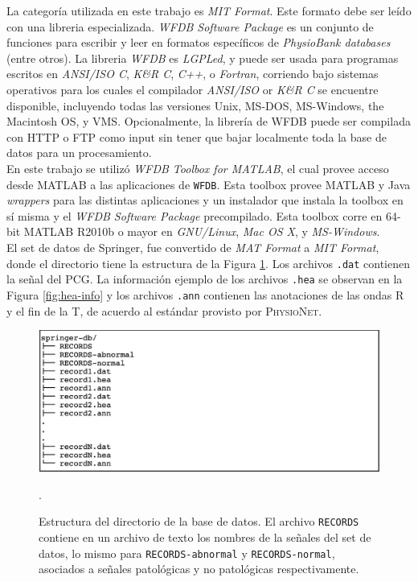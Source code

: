 \indent La categoría utilizada en este trabajo es \textit{MIT Format}. Este formato debe ser leído con una libreria
especializada. \textit{WFDB Software Package} es un conjunto de funciones para escribir y leer en formatos
específicos de \textit{PhysioBank databases} (entre otros). La libreria \textit{WFDB} es \textit{LGPLed}, y puede
ser usada para programas escritos en \textit{ANSI/ISO C}, \textit{K\&R C}, \textit{C++}, o \textit{Fortran},
corriendo bajo sistemas operativos para los cuales el compilador \textit{ANSI/ISO} or \textit{K\&R C} se encuentre
disponible, incluyendo todas las versiones Unix, MS-DOS, MS-Windows, the Macintosh OS, y VMS. Opcionalmente, la
librería de WFDB puede ser compilada con HTTP o FTP como input sin tener que bajar localmente toda la base de datos
para un procesamiento. \\
\indent En este trabajo se utilizó \textit{WFDB Toolbox for MATLAB\texttrademark}, el cual provee acceso desde
\textsc{MATLAB\texttrademark} a las aplicaciones de \texttt{WFDB}. Esta toolbox provee \textsc{MATLAB\texttrademark} y
Java
\textit{wrappers} para las distintas aplicaciones y un instalador que instala la toolbox en sí misma y el
\textit{WFDB Software Package} precompilado. Esta toolbox corre en 64-bit \textsc{MATLAB\texttrademark} R2010b o
mayor en \textit{GNU/Linux}, \textit{Mac OS X}, y \textit{MS-Windows}. \\
\indent El set de datos de Springer, fue convertido de \textit{MAT Format} a \textit{MIT Format}, donde el
directorio tiene la estructura de la Figura \ref{fig:springer-db}. Los archivos \texttt{.dat} contienen la señal del
PCG. La información ejemplo de los archivos \texttt{.hea} se observan en la Figura \ref{fig:hea-info} y los archivos
\texttt{.ann} contienen las anotaciones de las ondas R y el fin de la T, de acuerdo al estándar provisto por
\textsc{PhysioNet}.

\begin{figure}[H]
  \centering
  \includegraphics[scale=0.73]{sections/chapter-03/images/springer-db.png}
  \caption[Estructura del directorio de la base de datos.]{Estructura del directorio de la base de datos. El
  archivo \texttt{RECORDS} contiene en un archivo de texto los nombres de la señales del set de datos, lo mismo
  para \texttt{RECORDS-abnormal} y \texttt{RECORDS-normal}, asociados a señales patológicas y no patológicas
  respectivamente.}.
  \label{fig:springer-db}
\end{figure}

